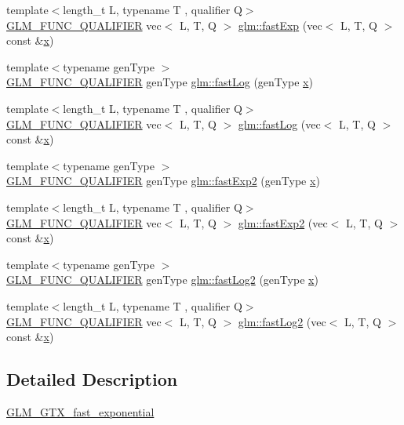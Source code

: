 \begin{DoxyCompactItemize}
\item 
{\footnotesize template$<$length\+\_\+t L, typename T , qualifier Q$>$ }\\\hyperlink{setup_8hpp_a33fdea6f91c5f834105f7415e2a64407}{G\+L\+M\+\_\+\+F\+U\+N\+C\+\_\+\+Q\+U\+A\+L\+I\+F\+I\+ER} vec$<$ L, T, Q $>$ \hyperlink{group__gtx__fast__exponential_ga3ba6153aec6bd74628f8b00530aa8d58}{glm\+::fast\+Exp} (vec$<$ L, T, Q $>$ const \&\hyperlink{_s_d_l__opengl_8h_ad0e63d0edcdbd3d79554076bf309fd47}{x})
\item 
{\footnotesize template$<$typename gen\+Type $>$ }\\\hyperlink{setup_8hpp_a33fdea6f91c5f834105f7415e2a64407}{G\+L\+M\+\_\+\+F\+U\+N\+C\+\_\+\+Q\+U\+A\+L\+I\+F\+I\+ER} gen\+Type \hyperlink{namespaceglm_a68f4f516c08702395c9b76791bab5969}{glm\+::fast\+Log} (gen\+Type \hyperlink{_s_d_l__opengl_8h_ad0e63d0edcdbd3d79554076bf309fd47}{x})
\item 
{\footnotesize template$<$length\+\_\+t L, typename T , qualifier Q$>$ }\\\hyperlink{setup_8hpp_a33fdea6f91c5f834105f7415e2a64407}{G\+L\+M\+\_\+\+F\+U\+N\+C\+\_\+\+Q\+U\+A\+L\+I\+F\+I\+ER} vec$<$ L, T, Q $>$ \hyperlink{group__gtx__fast__exponential_ga937256993a7219e73f186bb348fe6be8}{glm\+::fast\+Log} (vec$<$ L, T, Q $>$ const \&\hyperlink{_s_d_l__opengl_8h_ad0e63d0edcdbd3d79554076bf309fd47}{x})
\item 
{\footnotesize template$<$typename gen\+Type $>$ }\\\hyperlink{setup_8hpp_a33fdea6f91c5f834105f7415e2a64407}{G\+L\+M\+\_\+\+F\+U\+N\+C\+\_\+\+Q\+U\+A\+L\+I\+F\+I\+ER} gen\+Type \hyperlink{namespaceglm_a2a49ccff3646c4c60938e09a06f49e50}{glm\+::fast\+Exp2} (gen\+Type \hyperlink{_s_d_l__opengl_8h_ad0e63d0edcdbd3d79554076bf309fd47}{x})
\item 
{\footnotesize template$<$length\+\_\+t L, typename T , qualifier Q$>$ }\\\hyperlink{setup_8hpp_a33fdea6f91c5f834105f7415e2a64407}{G\+L\+M\+\_\+\+F\+U\+N\+C\+\_\+\+Q\+U\+A\+L\+I\+F\+I\+ER} vec$<$ L, T, Q $>$ \hyperlink{group__gtx__fast__exponential_gacaaed8b67d20d244b7de217e7816c1b6}{glm\+::fast\+Exp2} (vec$<$ L, T, Q $>$ const \&\hyperlink{_s_d_l__opengl_8h_ad0e63d0edcdbd3d79554076bf309fd47}{x})
\item 
{\footnotesize template$<$typename gen\+Type $>$ }\\\hyperlink{setup_8hpp_a33fdea6f91c5f834105f7415e2a64407}{G\+L\+M\+\_\+\+F\+U\+N\+C\+\_\+\+Q\+U\+A\+L\+I\+F\+I\+ER} gen\+Type \hyperlink{namespaceglm_ae4f91aa04733368c8e55da6e592005d8}{glm\+::fast\+Log2} (gen\+Type \hyperlink{_s_d_l__opengl_8h_ad0e63d0edcdbd3d79554076bf309fd47}{x})
\item 
{\footnotesize template$<$length\+\_\+t L, typename T , qualifier Q$>$ }\\\hyperlink{setup_8hpp_a33fdea6f91c5f834105f7415e2a64407}{G\+L\+M\+\_\+\+F\+U\+N\+C\+\_\+\+Q\+U\+A\+L\+I\+F\+I\+ER} vec$<$ L, T, Q $>$ \hyperlink{group__gtx__fast__exponential_ga7562043539194ccc24649f8475bc5584}{glm\+::fast\+Log2} (vec$<$ L, T, Q $>$ const \&\hyperlink{_s_d_l__opengl_8h_ad0e63d0edcdbd3d79554076bf309fd47}{x})
\end{DoxyCompactItemize}


\subsection{Detailed Description}
\hyperlink{group__gtx__fast__exponential}{G\+L\+M\+\_\+\+G\+T\+X\+\_\+fast\+\_\+exponential} 